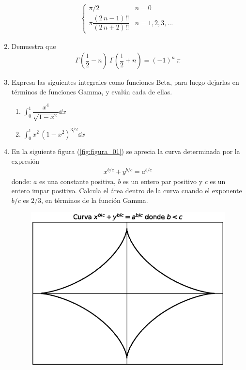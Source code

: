 \begin{enumerate}
\begin{align*}
\begin{cases}
\pi/2 & n = 0 \\[1em]
\pi \dfrac{(2 \, n - 1)!!}{(2 \, n + 2)!!} & n = 1,2,3,\ldots  \end{cases}
\end{align*} 
\item Demuestra que 
\begin{align*}
\Gamma \left( \dfrac{1}{2} - n \right) \: \Gamma \left( \dfrac{1}{2} + n \right) = (-1)^{n} \: \pi
\end{align*}
\newpage
\item Expresa las siguientes integrales como funciones Beta, para luego dejarlas en términos de funciones Gamma, y evalúa cada de ellas.
\begin{enumerate}
\item $\displaystyle \int_{0}^{1} \dfrac{x^{4}}{\sqrt{1 -x^{2}}} \dd{x}$
\item $\displaystyle \int_{0}^{1} x^{2} \, (1 - x^{2})^{3/2} \dd{x}$
\end{enumerate} 
\item En la siguiente figura (\ref{fig:figura_01}) se aprecia la curva determinada por la expresión
\begin{align*}
x^{b/c} + y^{b/c} = a^{b/c}
\end{align*}
donde: $a$ es una constante positiva, $b$ es un entero par positivo y $c$ es un entero impar positivo. Calcula el área dentro de la curva cuando el exponente $b/c$ es $2/3$, en términos de la función Gamma.
\begin{figure}[!ht]
    \centering
    \includegraphics[scale=0.8]{Imagenes/plot_curva_estrella_01.eps}

\end{figure}
\end{enumerate}
